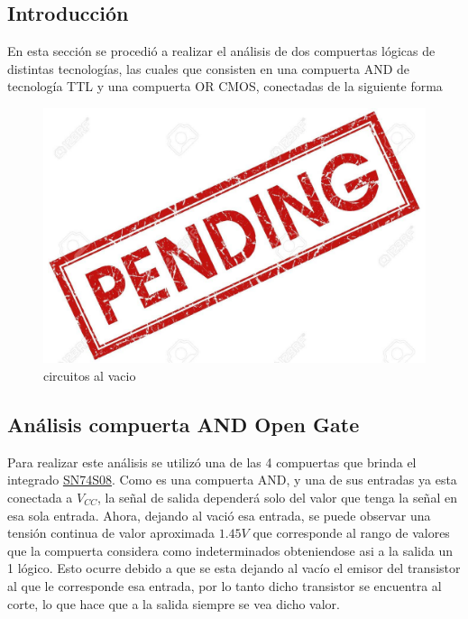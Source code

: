 


\subsection{Introducción}

En esta sección se procedió a realizar el análisis de dos compuertas lógicas de distintas tecnologías, las cuales que consisten en una compuerta AND de tecnología TTL y una compuerta OR CMOS, conectadas de la siguiente forma

\begin{figure}[h]
    \centering
    \includegraphics{ImagenesEjercicio5/pend.jpg}
    \caption{circuitos al vacio}
\end{figure}

\subsection{Análisis compuerta AND Open Gate}

Para realizar este análisis se utilizó una de las 4 compuertas que brinda el integrado \href{http://www.ti.com/lit/ds/symlink/sn74s08.pdf}{SN74S08}. Como es una compuerta AND, y una de sus entradas ya esta conectada a $V_{CC}$, la señal de salida dependerá solo del valor que tenga la señal en esa sola entrada. Ahora, dejando al vació esa entrada, se puede observar una tensión continua de valor aproximada $1.45 V$ que corresponde al rango de valores que la compuerta considera como indeterminados obteniendose asi a la salida un 1 lógico. Esto ocurre debido a que se esta dejando al vacío el emisor del transistor al que le corresponde esa entrada, por lo tanto dicho transistor se encuentra al corte, lo que hace que a la salida siempre se vea dicho valor.

